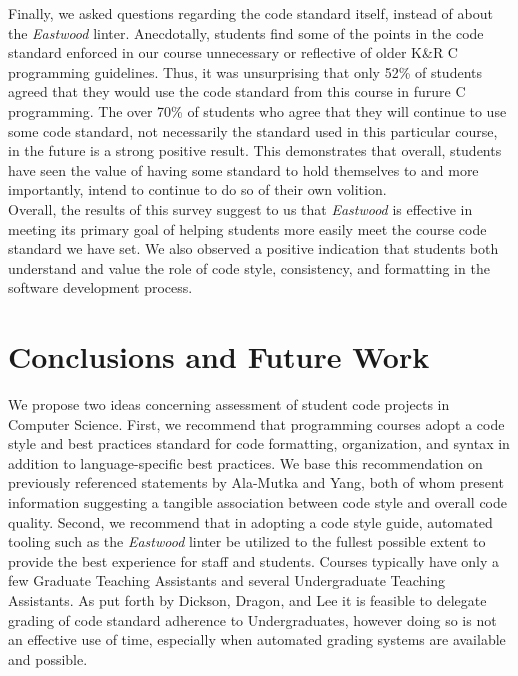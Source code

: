 \documentclass[sigconf]{acmart}
\begin{document}
Finally, we asked questions regarding the code standard itself, instead of about the
\textit{Eastwood} linter. Anecdotally, students find some of the points in the code
standard enforced in our course unnecessary or reflective of older K\&R C programming
guidelines. Thus, it was unsurprising that only 52\% of students agreed that they would
use the code standard from this course in furure C programming. The over 70\%
of students who agree that they will continue to use some code standard, not necessarily
the standard used in this particular course, in the future is a strong positive result.
This demonstrates that overall, students have seen the value of having some standard to
hold themselves to and more importantly, intend to continue to do so of their own
volition.
\\



Overall, the results of this survey suggest to us that \textit{Eastwood} is effective in
meeting its primary goal of helping students more easily meet the course code standard
we have set. We also observed a positive indication that students both understand and
value the role of code style, consistency, and formatting in the software development
process.
\\

\section{Conclusions and Future Work}

We propose two ideas concerning assessment of student code projects in Computer Science.
First, we recommend that programming courses adopt a code style and best practices
standard for code formatting, organization, and syntax in addition to language-specific
best practices. We base this recommendation on previously referenced statements by
Ala-Mutka and Yang, both of whom present information suggesting a tangible association
between code style and overall code quality. Second, we recommend that in adopting a
code style guide, automated tooling such as the \textit{Eastwood} linter be utilized to
the fullest possible extent to provide the best experience for staff and students.
Courses typically have only a few Graduate Teaching Assistants and several Undergraduate
Teaching Assistants. As put forth by Dickson, Dragon, and Lee
\cite{10.1145/3017680.3017725} it is feasible to delegate grading of code standard
adherence to Undergraduates, however doing so is not an effective use of time,
especially when automated grading systems are available and possible. 
\end{document}
